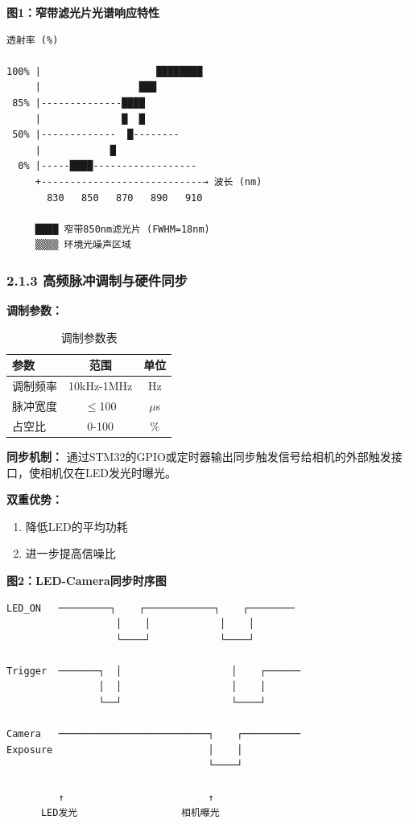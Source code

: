 \documentclass[12pt,a4paper]{article}
\begin{document}
\textbf{图1：窄带滤光片光谱响应特性}

\begin{verbatim}
透射率 (%)

100% |                    ████████
     |                 ███
 85% |--------------████
     |              █  █
 50% |-------------  █--------
     |            █
  0% |-----████------------------
     +----------------------------→ 波长 (nm)
       830   850   870   890   910

     ████ 窄带850nm滤光片 (FWHM=18nm)
     ▒▒▒▒ 环境光噪声区域
\end{verbatim}

\subsubsection{2.1.3 高频脉冲调制与硬件同步}

\textbf{调制参数：}

\begin{table}[H]
\centering
\caption{调制参数表}
\begin{tabular}{lcc}
\toprule
参数 & 范围 & 单位 \\
\midrule
调制频率 & 10kHz-1MHz & Hz \\
脉冲宽度 & $\le$100 & $\mu$s \\
占空比 & 0-100 & \% \\
\bottomrule
\end{tabular}
\end{table}

\textbf{同步机制：} 通过STM32的GPIO或定时器输出同步触发信号给相机的外部触发接口，使相机仅在LED发光时曝光。

\textbf{双重优势：}
\begin{enumerate}
\item 降低LED的平均功耗
\item 进一步提高信噪比
\end{enumerate}

\textbf{图2：LED-Camera同步时序图}

\begin{verbatim}
LED_ON   ─────────┐    ┌────────────┐    ┌────────
                   │    │            │    │
                   └────┘            └────┘

Trigger  ───────┐  │                   │    ┌──────
                │  │                   │    │
                └──┘                   └────┘

Camera   ──────────────────────────┐    ┌──────────
Exposure                           │    │
                                   └────┘

         ↑                         ↑
      LED发光                  相机曝光
\end{verbatim}
\end{document}
